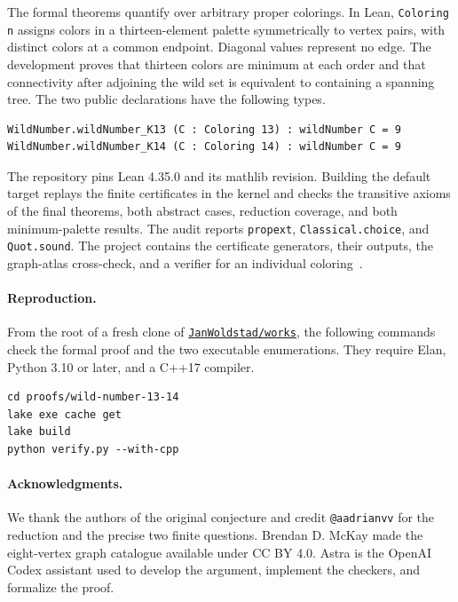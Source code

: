 \documentclass[11pt]{article}
\begin{document}
The formal theorems quantify over arbitrary proper colorings. In Lean,
\texttt{Coloring n} assigns colors in a thirteen-element palette
symmetrically to vertex pairs, with distinct colors at a common
endpoint. Diagonal values represent no edge. The development proves
that thirteen colors are minimum at each order and that connectivity
after adjoining the wild set is equivalent to containing a spanning tree.
The two public declarations have the following types.
{\small
\begin{verbatim}
WildNumber.wildNumber_K13 (C : Coloring 13) : wildNumber C = 9
WildNumber.wildNumber_K14 (C : Coloring 14) : wildNumber C = 9
\end{verbatim}
}
The repository pins Lean 4.35.0 and its mathlib revision. Building
the default target replays the finite certificates in the kernel and
checks the transitive axioms of the final theorems, both abstract
cases, reduction coverage, and both minimum-palette results. The audit
reports \texttt{propext}, \texttt{Classical.choice}, and
\texttt{Quot.sound}. The project contains the certificate generators,
their outputs, the graph-atlas cross-check, and a verifier for an
individual coloring~\cite{code}.

\paragraph{Reproduction.} From the root of a fresh clone of
\href{https://github.com/JanWoldstad/works}{\texttt{JanWoldstad/works}},
the following commands check the formal proof and the two executable
enumerations. They require Elan, Python 3.10 or later, and a C++17 compiler.
{\small
\begin{verbatim}
cd proofs/wild-number-13-14
lake exe cache get
lake build
python verify.py --with-cpp
\end{verbatim}
}
\paragraph{Acknowledgments.}
We thank the authors of the original conjecture and credit
\texttt{@aadrianvv} for the reduction and the precise two finite
questions. Brendan D. McKay made the eight-vertex graph catalogue
available under CC BY 4.0. Astra is the OpenAI Codex assistant used to
develop the argument, implement the checkers, and formalize the proof.
\end{document}
